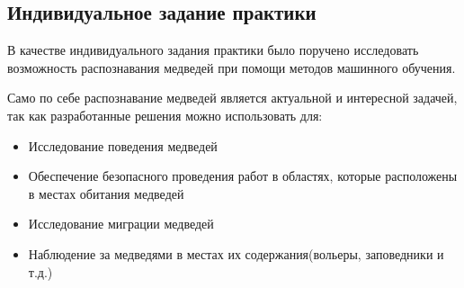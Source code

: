 \documentclass[../document.tex]{subfiles}
\begin{document}
    \subsection{Индивидуальное задание практики}
    \par В качестве индивидуального задания практики было поручено исследовать возможность распознавания медведей при помощи методов машинного обучения.
    \par Само по себе распознавание медведей является актуальной и интересной задачей, так как разработанные решения можно использовать для:
    \begin{itemize}
    	\item Исследование поведения медведей
    	\item Обеспечение безопасного проведения работ в областях, которые расположены в местах обитания медведей
    	\item Исследование миграции медведей
    	\item Наблюдение за медведями в местах их содержания(вольеры, заповедники и т.д.)
    \end{itemize}
\end{document}
